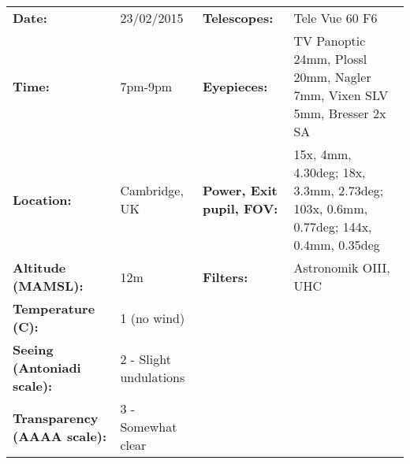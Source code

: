 \begin{tabular}{ p{1.7in} p{1.2in} p{1.5in} p{4.2in}}
{\bf Date:} & 23/02/2015 & {\bf Telescopes:} & Tele Vue 60 F6 \\ 
{\bf Time:} & 7pm-9pm & {\bf Eyepieces:} & TV Panoptic 24mm, Plossl 20mm, Nagler 7mm, Vixen SLV 5mm, Bresser 2x SA \\ 
{\bf Location:} & Cambridge, UK & {\bf Power, Exit pupil, FOV:} & 15x, 4mm, 4.30deg; 18x, 3.3mm, 2.73deg; 103x, 0.6mm, 0.77deg; 144x, 0.4mm, 0.35deg \\ 
{\bf Altitude (MAMSL):} & 12m & {\bf Filters:} & Astronomik OIII, UHC \\ 
{\bf Temperature (C):} & 1 (no wind) & & \\ 
{\bf Seeing (Antoniadi scale):} & 2 - Slight undulations & & \\ 
{\bf Transparency (AAAA scale):} & 3 - Somewhat clear & & \\ 
\end{tabular}
\centering 
